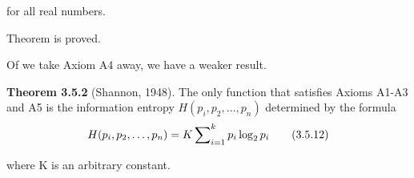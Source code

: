 \documentclass{extbook}
\newcommand{\resetWhitespace}{
	\setlength{\abovedisplayskip}{4pt}
	\setlength{\belowdisplayskip}{4pt}
}
\begin{document}
\noindent for all real numbers.

Theorem is proved.

Of we take Axiom A4 away, we have a weaker result.

\textbf{Theorem 3.5.2} (Shannon, 1948). The only function that satisfies Axioms A1-A3 and A5 is the information entropy $H(p_{i}, p_{2}, \dots , p_{n})$ determined by the formula
\begin{equation}
	\resetWhitespace
	H(p_{i}, p_{2}, \dots , p_{n}) = K\sum\nolimits_{i=1}^{k}p_{i} \log_{2}p_{i}
	\tag{3.5.12}
\end{equation}

\noindent where K is an arbitrary constant.
\end{document}
